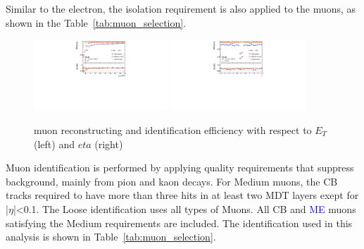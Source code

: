 Similar to the electron, the isolation requirement is also applied to the muons, as shown in the Table~\ref{tab:muon_selection}.
\begin{figure}[tbp]
\begin{center}
 \includegraphics[width=0.45\textwidth,keepaspectratio]{figures/Reconstruction/recoMuonpT}
 \includegraphics[width=0.45\textwidth,keepaspectratio]{figures/Reconstruction/recoMuonEta}
\caption{
muon reconstructing and identification efficiency with respect to $E_T$ (left) and $eta$ (right) \cite{MUON-2018-03}
}
\label{fig:recoMuon}
\end{center}
\end{figure}
Muon identification is performed by applying quality requirements that suppress background, mainly from pion and kaon decays. 
For Medium muons, the CB tracks required to have more than three hits in at least two MDT layers exept for |$\eta$|<0.1.
The Loose identification uses all types of Muons. 
All CB and \textcolor{blue}{ME} muons satisfying the Medium requirements are included. 
The identification used in this analysis is shown in Table~\ref{tab:muon_selection}.
